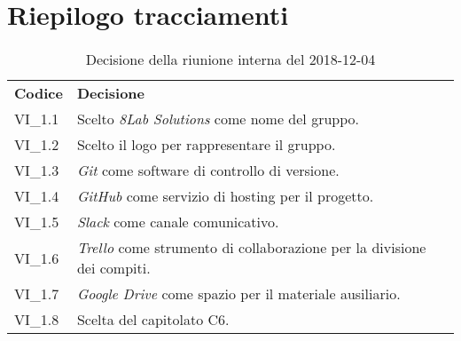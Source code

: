 \section{Riepilogo tracciamenti}
\begin{table}[H]
	
	\begin{longtable}{ >{\centering}p{} >{\centering}p{}}
			
		\rowcolorhead
		\centering \textbf{\color{white}Codice} 
		& \centering \textbf{\color{white}Decisione} 
		
		\tabularnewline 
		VI\_1.1 & Scelto \textit{8Lab Solutions} come nome del gruppo.
		
		\tabularnewline 
		VI\_1.2 & Scelto il logo per rappresentare il gruppo.
		
		\tabularnewline 
		VI\_1.3 & \textit{Git} come software di controllo di versione.
	
		\tabularnewline 
		VI\_1.4 & \textit{GitHub} come servizio di hosting per il progetto.
		
		\tabularnewline 
		VI\_1.5 & \textit{Slack} come canale comunicativo.
		
		\tabularnewline 
		VI\_1.6 & \textit{Trello} come strumento di collaborazione per la divisione 
				dei compiti.
	
		\tabularnewline 
		VI\_1.7 & \textit{Google Drive} come spazio per il materiale ausiliario.
		
		\tabularnewline
		VI\_1.8 & Scelta del capitolato C6.	
	
	\end{longtable}
	\caption{Decisione della riunione interna del 2018-12-04}	

\end{table}




